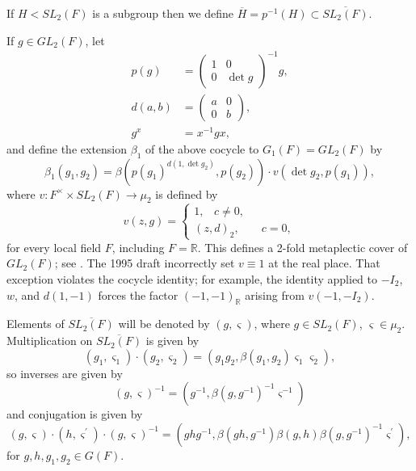 \documentclass[12pt,letterpaper,openany]{book}
\theoremstyle{plain}
\theoremstyle{definition}
\theoremstyle{remark}
\theoremstyle{remark}
\begin{document}
If $H<SL_2(F)$ is a subgroup then we define $\overline{H}=p^{-1}(H)\subset
\overline{SL_2(F)}$.

If $g\in GL_2(F)$, let
\begin{align*}
p(g) &=\left(
\begin{array}{cc}
1 & 0 \\
0 & \det g
\end{array}
\right) ^{-1}g, \\
d(a,b) &=\left(
\begin{array}{cc}
a & 0 \\
0 & b
\end{array}
\right) , \\
g^x &=x^{-1}gx,
\end{align*}
and define the extension $\beta _1$ of the above cocycle to
$G_1(F)=GL_2(F)$ by
\begin{equation}
\beta _1(g_1,g_2)=\beta (p(g_1)^{d(1,\det g_2)},p(g_2))\cdot v(\det
g_2,p(g_1)),\label{eq:beta1}
\end{equation}
where $v:F^{\times }\times SL_2(F)\rightarrow \mu_2$ is defined by
\[
v(z,g)=\left\{
\begin{array}{c}
1,\;\;\;c\neq 0, \\
(z,d)_2,\;\;\;\;\;\;\;c=0,
\end{array}
\right.
\]
for every local field $F$, including $F=\mathbb R$. This defines a
2-fold metaplectic cover of $GL_2(F)$; see \cite[\S2.1]{Ge2}.
The 1995 draft incorrectly set $v\equiv 1$ at the real place.
That exception violates the cocycle identity; for example, the identity
applied to $-I_2$, $w$, and $d(1,-1)$ forces the factor
$(-1,-1)_{\mathbb R}$ arising from $v(-1,-I_2)$.

Elements of $\overline{SL_2(F)}$ will be denoted by $(g,\varsigma )$,
where $g\in SL_2(F)$, $\varsigma \in \mu _2$.
Multiplication on $\overline{SL_2(F)}$ is given by
\begin{equation}
(g_1,\varsigma _1)\cdot (g_2,\varsigma _2)=(g_1g_2,\beta (g_1,g_2)\varsigma
_1\varsigma _2),\label{eq:mult}
\end{equation}
so inverses are given by
\begin{equation}
(g,\varsigma )^{-1}=(g^{-1},\beta (g,g^{-1})^{-1}\varsigma ^{-1})\label{eq:inv}
\end{equation}
and conjugation is given by
\begin{equation}
(g,\varsigma )\cdot (h,\varsigma ^{\prime })\cdot (g,\varsigma
)^{-1}=(ghg^{-1},\beta (gh,g^{-1})\beta (g,h)\beta (g,g^{-1})^{-1}\varsigma
^{\prime }),\label{eq:conj}
\end{equation}
for $g,h,g_1,g_2\in G(F)$.
\end{document}

